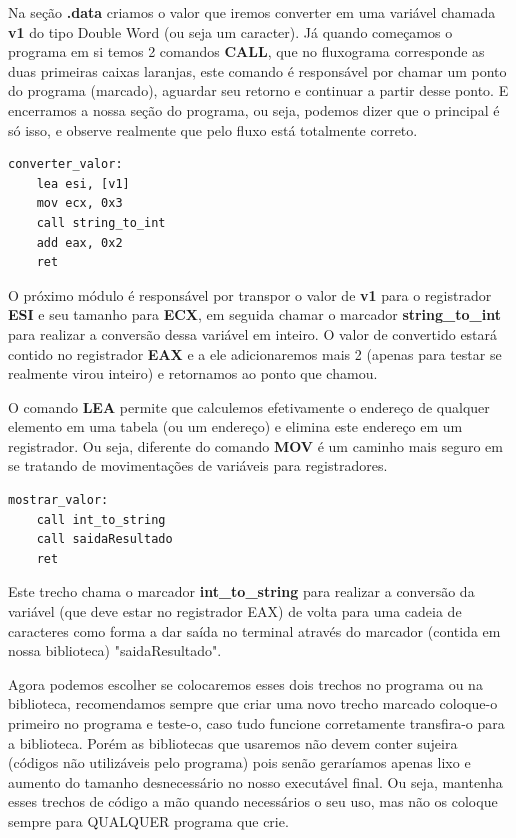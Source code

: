 Na seção \textbf{.data} criamos o valor que iremos converter em uma variável chamada \textbf{v1} do tipo Double Word (ou seja um caracter). Já quando começamos o programa em si temos 2 comandos \textbf{CALL}, que no fluxograma corresponde as duas primeiras caixas laranjas, este comando é responsável por chamar um ponto do programa (marcado), aguardar seu retorno e continuar a partir desse ponto. E encerramos a nossa seção do programa, ou seja, podemos dizer que o principal é só isso, e observe realmente que pelo fluxo está totalmente correto.
\begin{lstlisting}[]
converter_valor:
	lea esi, [v1]
	mov ecx, 0x3
	call string_to_int
	add eax, 0x2
	ret
\end{lstlisting}

O próximo módulo é responsável por transpor o valor de \textbf{v1} para o registrador \textbf{ESI} e seu tamanho para \textbf{ECX}, em seguida chamar o marcador \textbf{string\_to\_int} para realizar a conversão dessa variável em inteiro. O valor de convertido estará contido no registrador \textbf{EAX} e a ele adicionaremos mais 2 (apenas para testar se realmente virou inteiro) e retornamos ao ponto que chamou.

O comando \textbf{LEA} permite que calculemos efetivamente o endereço de qualquer elemento em uma tabela (ou um endereço) e elimina este endereço em um registrador. Ou seja, diferente do comando \textbf{MOV} é um caminho mais seguro em se tratando de movimentações de variáveis para registradores.

\begin{lstlisting}[]
mostrar_valor:
	call int_to_string
	call saidaResultado
	ret
\end{lstlisting}

Este trecho chama o marcador \textbf{int\_to\_string} para realizar a conversão da variável (que deve estar no registrador EAX) de volta para uma cadeia de caracteres como forma a dar saída no terminal através do marcador (contida em nossa biblioteca) "saidaResultado".

Agora podemos escolher se colocaremos esses dois trechos no programa ou na biblioteca, recomendamos sempre que criar uma novo trecho marcado coloque-o primeiro no programa e teste-o, caso tudo funcione corretamente transfira-o para a biblioteca. Porém as bibliotecas que usaremos não devem conter sujeira (códigos não utilizáveis pelo programa) pois senão geraríamos apenas lixo e aumento do tamanho desnecessário no nosso executável final. Ou seja, mantenha esses trechos de código a mão quando necessários o seu uso, mas não os coloque sempre para QUALQUER programa que crie.

